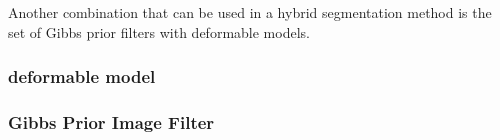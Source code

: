 Another combination that can be used in a hybrid segmentation method is the
set of Gibbs prior filters with deformable models.

\subsubsection{deformable model}



\subsubsection{Gibbs Prior Image Filter}


